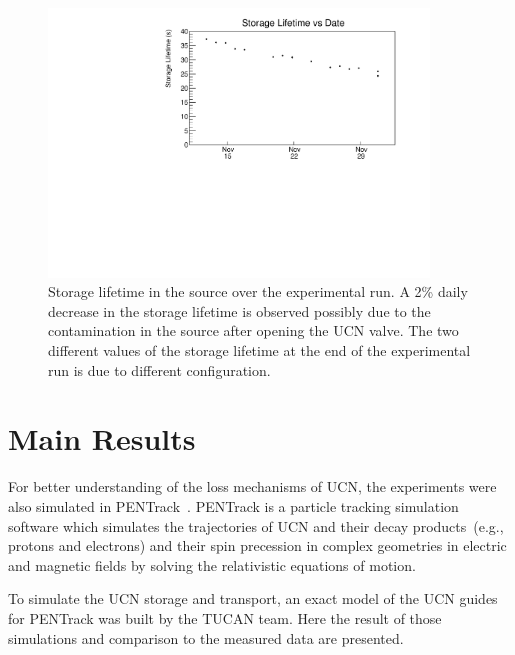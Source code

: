 \begin{figure}[h!]
  \centering
  \includegraphics[width=0.9\textwidth]{storageLifetime_vs_time.pdf}
  \caption[Storage lifetime in the source over the experimental
  run]{Storage lifetime in the source over the experimental run. A 2\%
    daily decrease in the storage lifetime is observed possibly due to
    the contamination in the source after opening the UCN valve. The
    two different values of the storage lifetime at the end of the
    experimental run is due to different configuration.}
  \label{fig:storagelifetime_overall}
\end{figure}


\section{Main Results\label{sec:pentrack}}

For better understanding of the loss mechanisms of UCN, the
experiments were also simulated in
PENTrack~\cite{schreyer2017pentrack}. PENTrack is a particle tracking
simulation software which simulates the trajectories of UCN and their
decay products~(e.g., protons and electrons) and their spin precession
in complex geometries in electric and magnetic fields by solving the
relativistic equations of motion.

To simulate the UCN storage and transport, an exact model of the UCN
guides for PENTrack was built by the TUCAN team. Here the result of
those simulations and comparison to the measured data are presented.
